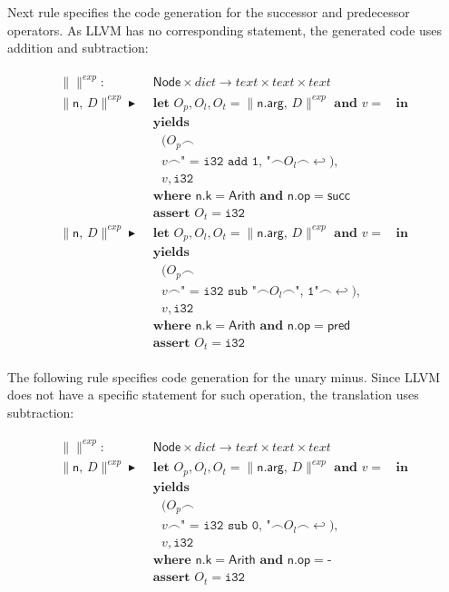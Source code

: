 \documentclass{article}
\newcommand{\trad}[2]{\ensuremath{\lVert \textsf{#1} \rVert^{\textit{#2}}}}
\newcommand{\nl}[0]{\ensuremath{\hookleftarrow}}
\DeclareMathOperator{\conc}{\smallfrown}
\DeclareMathOperator{\isdef}{\blacktriangleright}
\DeclareMathOperator{\name}{\mathcal{L}()}
\begin{document}
Next rule specifies the code generation for the successor and
predecessor operators. As LLVM has no corresponding statement, the
generated code uses addition and subtraction:
\begin{framed}
\begin{align}
\begin{split}
 \trad{}{exp} : & \textsf{ Node} \times dict  \rightarrow text \times text \times  text\\
  \trad{n, $D$}{exp} \isdef & \textbf{ let } O_p, O_l, O_t =
  \trad{n.arg, $D$}{exp} \textbf{ and } v = \name \textbf{ in } \\
  & \textbf{ yields} \\
  & \quad (O_p \conc \\
  & \quad v \conc \texttt{" = i32 add 1, "} \conc O_l \conc \nl), \\
  & \quad v, \texttt{i32} \\
  & \textbf{ where } \textsf{n.k} = \textsf{Arith} \textbf{ and } \textsf{n.op} = \textsf{succ} \\
  & \textbf{ assert } O_t = \texttt{i32} \\
  \trad{n, $D$}{exp} \isdef & \textbf{ let } O_p, O_l, O_t =
  \trad{n.arg, $D$}{exp} \textbf{ and } v = \name \textbf{ in } \\
  & \textbf{ yields} \\
  & \quad (O_p \conc \\
  & \quad v \conc \texttt{" = i32 sub "} \conc O_l \conc \texttt{", 1"} \conc \nl), \\
  & \quad v, \texttt{i32} \\
  & \textbf{ where } \textsf{n.k} = \textsf{Arith} \textbf{ and } \textsf{n.op} = \textsf{pred} \\
  & \textbf{ assert } O_t = \texttt{i32}
\end{split}
\end{align}
\end{framed}

The following rule specifies code generation for the unary
minus. Since LLVM does not have a specific statement for such
operation, the translation uses subtraction:
\begin{framed}
\begin{align}
\begin{split}
 \trad{}{exp} : & \textsf{ Node} \times dict  \rightarrow text \times text \times  text\\
  \trad{n, $D$}{exp} \isdef & \textbf{ let } O_p, O_l, O_t =
  \trad{n.arg, $D$}{exp} \textbf{ and } v = \name \textbf{ in } \\
  & \textbf{ yields} \\
  & \quad (O_p \conc \\
  & \quad v \conc \texttt{" = i32 sub 0, "} \conc O_l \conc \nl), \\
  & \quad v, \texttt{i32} \\
  & \textbf{ where } \textsf{n.k} = \textsf{Arith} \textbf{ and } \textsf{n.op} = \textsf{-} \\
  & \textbf{ assert } O_t = \texttt{i32}
\end{split}
\end{align}
\end{framed}
\end{document}
